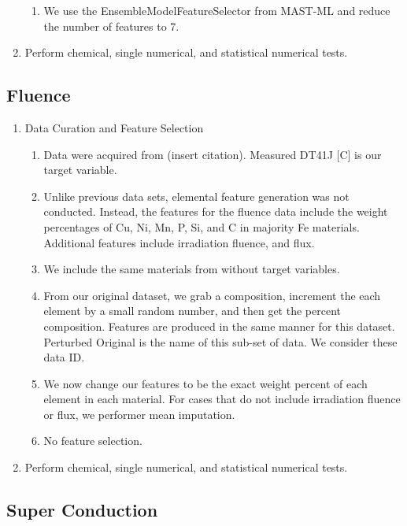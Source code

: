 \begin{enumerate}
\begin{enumerate}
        \item We use the EnsembleModelFeatureSelector from MAST-ML and reduce the number of features to 7.
    
    \end{enumerate}
    
    \item Perform chemical, single numerical, and statistical numerical tests.

\end{enumerate}


\subsection{Fluence}
\begin{enumerate}
    \item Data Curation and Feature Selection

    \begin{enumerate}
        \item Data were acquired from (insert citation). Measured DT41J [C] is our target variable.
        \item Unlike previous data sets, elemental feature generation was not conducted. Instead, the features for the fluence data include the weight percentages of Cu, Ni, Mn, P, Si, and C in majority Fe materials. Additional features include irradiation fluence, and flux.
        \item We include the same materials from \cite{nickel_institute} without target variables.
        \item From our original dataset, we grab a composition, increment the each element by a small random number, and then get the percent composition. Features are produced in the same manner for this dataset. Perturbed Original is the name of this sub-set of data. We consider these data ID.
        \item We now change our features to be the exact weight percent of each element in each material. For cases that do not include irradiation fluence or flux, we performer mean imputation.
        \item No feature selection.
    \end{enumerate}

    \item Perform chemical, single numerical, and statistical numerical tests.

\end{enumerate}

\subsection{Super Conduction}

